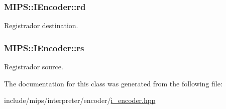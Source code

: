 \subsubsection[{\texorpdfstring{rd}{rd}}]{ M\+I\+P\+S\+::\+I\+Encoder\+::rd\hspace{0.3cm}{\ttfamily [protected]}}\hypertarget{classMIPS_1_1IEncoder_a557c518ccc256d518b393f844ff12c29}{}\label{classMIPS_1_1IEncoder_a557c518ccc256d518b393f844ff12c29}
Registrador destination. 
\subsubsection[{\texorpdfstring{rs}{rs}}]{ M\+I\+P\+S\+::\+I\+Encoder\+::rs\hspace{0.3cm}{\ttfamily [protected]}}\hypertarget{classMIPS_1_1IEncoder_a0459966a1a63c56ad414f5f177eced99}{}\label{classMIPS_1_1IEncoder_a0459966a1a63c56ad414f5f177eced99}
Registrador source. 

The documentation for this class was generated from the following file\+:\begin{DoxyCompactItemize}
\item 
include/mips/interpreter/encoder/\hyperlink{i__encoder_8hpp}{i\+\_\+encoder.\+hpp}\end{DoxyCompactItemize}
